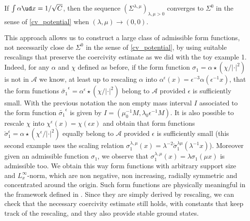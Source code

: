 \begin{lemma}\label{lemma_cv_potential}
If $\int\alpha\ud x=1/\sqrt{C}$, then the sequence $(\Sigma^{\lambda,\mu})_{\lambda,\mu>0}$ converges to $\Sigma^{0}$ in the sense of \eqref{cv_potential} when $(\lambda,\mu)\to(0,0)$.
\end{lemma}

This approach allows us to construct a large class of admissible form functions, not necessarily close de $\Sigma^0$ in the sense of \eqref{cv_potential}, by using suitable rescalings that preserve the coercivity estimate as we did with the toy example 1.
Indeed, for any $\alpha$ and $\chi$ defined as before, if the form function $\sigma_{1}=\alpha\star(\chi/|\cdot|^{2})$ is not in $\mathscr{A}$ we know, at least up to rescaling $\alpha$ into $\alpha^{\epsilon}(x)=\epsilon^{-3}\alpha(\epsilon^{-1}x)$,
that the form functions $\widetilde{\sigma_{1}}^{\epsilon}=\alpha^{\epsilon}\star(\chi/|\cdot|^{2})$ belong to $\mathscr{A}$ provided $\epsilon$ is sufficiently small.
With the previous notation the non empty mass interval $I$ associated to the form function $\widetilde{\sigma_{1}}^{\epsilon}$ is given by $I=(\mu_{0}^{-1}M,\lambda_{0}\epsilon^{-1}M)$. It is also possible to rescale $\chi$ into $\chi^{\epsilon}(x)=\chi(\epsilon x)$ and obtain that form functions $\check{\sigma}_{1}^{\epsilon}=\alpha\star(\chi^{\epsilon}/|\cdot|^{2})$ equally belong to $\mathscr{A}$ provided $\epsilon$ is sufficiently small (this second example uses the scaling relation $\sigma_{1}^{\lambda,\mu}(x)=\lambda^{-2}\check{\sigma}_{1}^{\lambda\mu}(\lambda^{-1}x)$).
Moreover given an admissible function $\sigma_{1}$, we observe that $\sigma_{1}^{\lambda,\mu}(x)=\lambda\sigma_{1}(\mu x)$ is admissible too.
We obtain this way form functions with arbitrary support size and $L_{x}^{\infty}$-norm, which are non negative, non increasing, radially symmetric and concentrated around the origin. Such form functions are physically meaningful in the framework defined in \cite{BdB}.
Since they are simply derived by rescaling, we can check that the necessary coercivity estimate still holds, with constants that keep track of the rescaling, and they also provide stable ground states.


